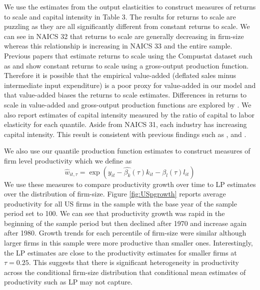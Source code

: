 \documentclass[11pt]{article}
\begin{document}
We use the estimates from the output elasticities to construct measures of returns to scale and capital intensity in Table 3. The results for returns to scale are puzzling as they are all significantly different from constant returns to scale. We can see in NAICS 32 that returns to scale are generally decreasing in firm-size whereas this relationship is increasing in NAICS 33 and the entire sample. Previous papers that estimate returns to scale using the Compustat dataset such as \cite{Keller2009} and \cite{mert} show constant returns to scale using a gross-output production function. Therefore it is possible that the empirical value-added (deflated sales minus intermediate input expenditure) is a poor proxy for value-added in our model and that value-added biases the returns to scale estimates. Differences in returns to scale in value-added and gross-output production functions are explored by \cite{Basu1997}. We also report estimates of capital intensity measured by the ratio of capital to labor elasticity for each quantile. Aside from NAICS 31, each industry has increasing capital intensity. This result is consistent with previous findings such as \cite{Holmes2008}, \cite{Kumar1999} and \cite{mert}.




We also use our quantile production function estimates to construct measures of firm level productivity which we define as
\begin{equation}
\hat{w}_{it,\tau}=\exp(y_{it}-\hat{\beta_{k}}(\tau)k_{it}-\hat{\beta_{l}}(\tau)l_{it})
\end{equation}
We use these measures to compare productivity growth over time to LP estimates over the distribution of firm-size. Figure \ref{fig:USpgrowth} reports average productivity for all US firms in the sample with the base year of the sample period set to 100. We can see that productivity growth was rapid in the beginning of the sample period but then declined after 1970 and increase again after 1980. Growth trends for each percentile of firm-size were similar although larger firms in this sample were more productive than smaller ones. Interestingly, the LP estimates are close to the productivity estimates for smaller firms at $\tau=0.25$. This suggests that there is significant heterogeneity in productivity across the conditional firm-size distribution that conditional mean estimates of productivity such as LP may not capture.
\end{document}
